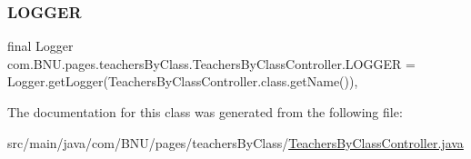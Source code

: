 \subsubsection{\texorpdfstring{L\+O\+G\+G\+ER}{LOGGER}}
{\footnotesize\ttfamily final Logger com.\+B\+N\+U.\+pages.\+teachers\+By\+Class.\+Teachers\+By\+Class\+Controller.\+L\+O\+G\+G\+ER = Logger.\+get\+Logger(Teachers\+By\+Class\+Controller.\+class.\+get\+Name())\hspace{0.3cm}{\ttfamily [static]}, {\ttfamily [private]}}



The documentation for this class was generated from the following file\+:\begin{DoxyCompactItemize}
\item 
src/main/java/com/\+B\+N\+U/pages/teachers\+By\+Class/\mbox{\hyperlink{_teachers_by_class_controller_8java}{Teachers\+By\+Class\+Controller.\+java}}\end{DoxyCompactItemize}
